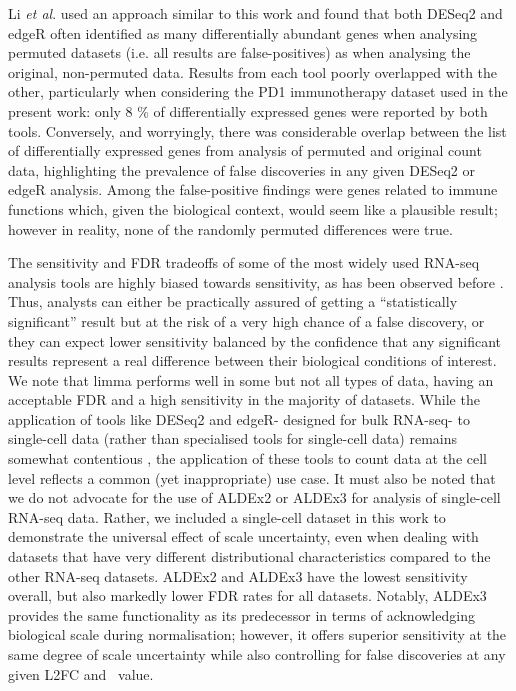 \documentclass[10pt,letterpaper]{article}
\begin{document}
Li \textit{et al}. \cite{li_exaggerated_2022} used an approach similar to this work and found that both DESeq2 and edgeR often identified as many differentially abundant genes when analysing permuted datasets (i.e. all results are false-positives) as when analysing the original, non-permuted data. Results from each tool poorly overlapped with the other, particularly when considering the PD1 immunotherapy dataset used in the present work: only 8 \% of differentially expressed genes were reported by both tools. Conversely, and worryingly, there was considerable overlap between the list of differentially expressed genes from analysis of permuted and original count data, highlighting the prevalence of false discoveries in any given DESeq2 or edgeR analysis. Among the false-positive findings were genes related to immune functions which, given the biological context, would seem like a plausible result; however in reality, none of the randomly permuted differences were true.

The sensitivity and FDR tradeoffs of some of the most widely used RNA-seq analysis tools are highly biased towards sensitivity, as has been observed before \cite{hawinkel2017, weiss_normalization_2017, Nearing:2022aa, li_exaggerated_2022}. Thus, analysts can either be practically assured of getting a ``statistically significant'' result but at the risk of a very high chance of a false discovery, or they can expect lower sensitivity balanced by the confidence that any significant results represent a real difference between their biological conditions of interest. We note that limma performs well in some but not all types of data, having an acceptable FDR and a high sensitivity in the majority of datasets. While the application of tools like DESeq2 and edgeR- designed for bulk RNA-seq- to single-cell data (rather than specialised tools for single-cell data) remains somewhat contentious \cite{murphy_balanced_2022}, the application of these tools to count data at the cell level reflects a common (yet inappropriate) use case. It must also be noted that we do not advocate for the use of ALDEx2 or ALDEx3 for analysis of single-cell RNA-seq data. Rather, we included a single-cell dataset in this work to demonstrate the universal effect of scale uncertainty, even when dealing with datasets that have very different distributional characteristics compared to the other RNA-seq datasets. ALDEx2 and ALDEx3 have the lowest sensitivity overall, but also markedly lower FDR rates for all datasets. Notably, ALDEx3 provides the same functionality as its predecessor in terms of acknowledging biological scale during normalisation; however, it offers superior sensitivity at the same degree of scale uncertainty while also controlling for false discoveries at any given L2FC and \textgamma~value.
\end{document}
